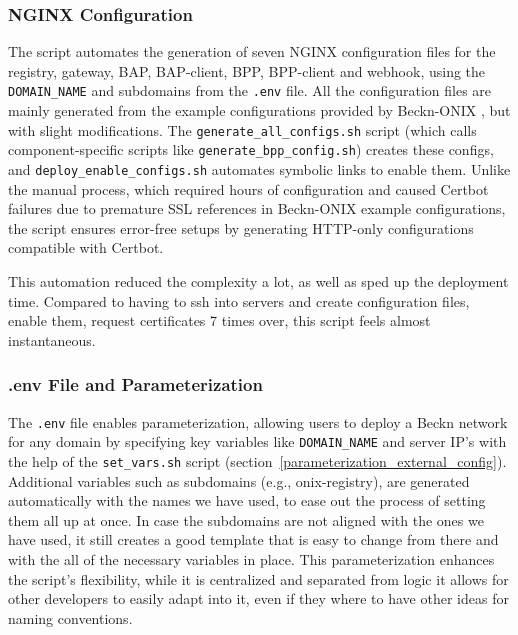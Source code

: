\subsubsection{NGINX Configuration} \label{nginx_configuration}
The script automates the generation of seven NGINX configuration files for the registry, gateway, BAP, BAP-client, BPP, BPP-client and webhook, using the \texttt{DOMAIN\_NAME} and subdomains from the \texttt{.env} file. All the configuration files are mainly generated from the example configurations provided by Beckn-ONIX \citep{becknNginxConfig}, but with slight modifications. The \texttt{generate\_all\_configs.sh} script (which calls component-specific scripts like \texttt{generate\_bpp\_config.sh}) creates these configs, and \texttt{deploy\_enable\_configs.sh} automates symbolic links to enable them. Unlike the manual process, which required hours of configuration and caused Certbot failures due to premature SSL references in Beckn-ONIX example configurations, the script ensures error-free setups by generating HTTP-only configurations compatible with Certbot.

This automation reduced the complexity a lot, as well as sped up the deployment time. Compared to having to ssh into servers and create configuration files, enable them, request certificates 7 times over, this script feels almost instantaneous.

\subsubsection{.env File and Parameterization}
\label{env_config}
The \texttt{.env} file enables parameterization, allowing users to deploy a Beckn network for any domain by specifying key variables like \texttt{DOMAIN\_NAME} and server IP's with the help of the \texttt{set\_vars.sh} script (section~\ref{parameterization_external_config}). Additional variables such as subdomains (e.g., onix-registry), are generated automatically with the names we have used, to ease out the process of setting them all up at once. In case the subdomains are not aligned with the ones we have used, it still creates a good template that is easy to change from there and with the all of the necessary variables in place. 
This parameterization enhances the script's flexibility, while it is centralized and separated from logic it allows for other developers to easily adapt into it, even if they where to have other ideas for naming conventions.

